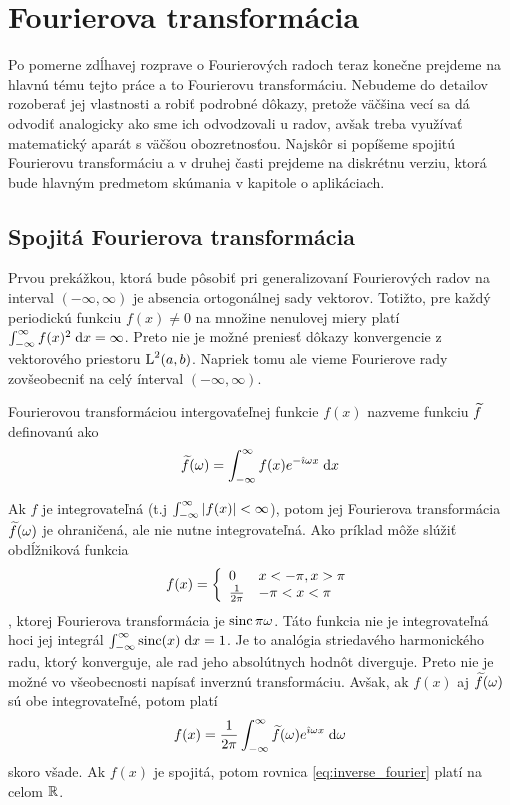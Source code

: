 \section{Fourierova transformácia}
Po pomerne zdĺhavej rozprave o Fourierových radoch teraz konečne
prejdeme na hlavnú tému tejto práce a to Fourierovu transformáciu.
Nebudeme do detailov rozoberať jej vlastnosti a robiť podrobné dôkazy,
pretože väčšina vecí sa dá odvodiť analogicky ako sme ich odvodzovali
u radov, avšak treba využívať matematický aparát s väčšou
obozretnosťou. Najskôr si popíšeme spojitú Fourierovu transformáciu a
v druhej časti prejdeme na diskrétnu verziu, ktorá bude hlavným
predmetom skúmania v kapitole o aplikáciach.

\subsection{Spojitá Fourierova transformácia}
Prvou prekážkou, ktorá bude pôsobiť pri generalizovaní Fourierových
radov na interval $(-\infty,\infty)$ je absencia ortogonálnej sady
vektorov. Totižto, pre každý periodickú funkciu $f(x)\not=0$ na
množine nenulovej miery platí $\int_{-\infty}^{\infty} f(x)^2 \; \mathrm{d} x = \infty$.
Preto nie je možné preniesť dôkazy konvergencie z vektorového
priestoru $\mbox{L}^2(a,b)$. Napriek tomu ale vieme Fourierove rady zovšeobecniť
na celý ínterval $(-\infty,\infty)$.
\begin{definicia}
    Fourierovou transformáciou intergovaťeľnej funkcie $f(x)$ nazveme
    funkciu $\widetilde{f}$ definovanú ako
    \begin{equation}
        \widetilde{f}(\omega) = \int_{-\infty}^{\infty} f(x) e^{-\hat{\imath} \omega x} \; \mathrm{d} x
    \end{equation}
    \label{def:fourier_transform}
\end{definicia}
Ak $f$ je integrovateľná (t.j $\int_{-\infty}^{\infty} |f(x)| < \infty$), potom jej
Fourierova transformácia $\widetilde{f}(\omega)$ je ohraničená, ale nie nutne
integrovateľná. Ako príklad môže slúžiť obdĺžniková funkcia 
\begin{equation}
    f(x) = \left\{  \begin{array}{l l}
                        0&x <-\pi, x>\pi \\
                        \frac{1}{2\pi}& -\pi<x<\pi
                    \end{array}
            \right.
\end{equation}
, ktorej Fourierova transformácia je $\operatorname{sinc}{\pi \omega}$. Táto funkcia
nie je integrovateľná hoci jej integrál $\int_{-\infty}^{\infty} \operatorname{sinc}(x) \; \mathrm{d} x = 1$.
Je to analógia striedavého harmonického radu, ktorý konverguje, ale
rad jeho absolútnych hodnôt diverguje.
Preto nie je možné vo všeobecnosti napísať inverznú transformáciu.
Avšak, ak $f(x)$ aj $\widetilde{f}(\omega)$ sú obe integrovateľné, potom platí
\begin{equation}
    f(x) = \frac{1}{2\pi} \int_{-\infty}^{\infty} 
        \widetilde{f}(\omega) e^{\hat{\imath} \omega x} \; \mathrm{d} \omega
    \label{eq:inverse_fourier}
\end{equation}
skoro všade. Ak $f(x)$ je spojitá, potom rovnica
\ref{eq:inverse_fourier} platí na celom ${\mathbb R}$.

